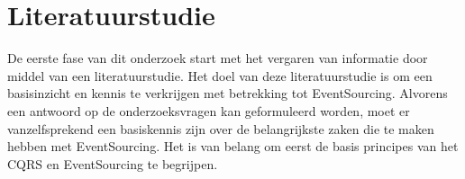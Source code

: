 \section{Literatuurstudie}
\label{sec:literatuurstudie}

De eerste fase van dit onderzoek start met het vergaren van informatie door middel van een literatuurstudie. Het doel van deze literatuurstudie is om een basisinzicht en kennis te verkrijgen met betrekking tot EventSourcing. Alvorens een antwoord op de onderzoeksvragen kan geformuleerd worden, moet er vanzelfsprekend een basiskennis zijn over de belangrijkste zaken die te maken hebben met EventSourcing. Het is van belang om eerst de basis principes van het \gls{CQRS} en EventSourcing te begrijpen.